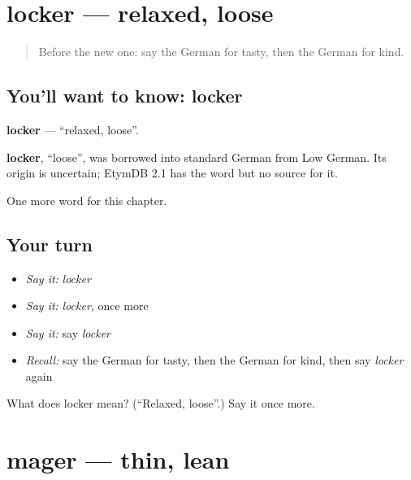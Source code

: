\section[locker]{locker — relaxed, loose}

\label{lesson:GE-C218-locker}



\begin{quote}
Before the new one: say the German for tasty, then the German for kind.
\end{quote}

\subsection*{You'll want to know: locker}
\textbf{locker} — \textquotedblleft{}relaxed, loose\textquotedblright{}.

\begin{cousinweb}
\textbf{locker}, \textquotedblleft{}loose\textquotedblright{}, was borrowed into standard German from Low German. Its origin is uncertain; EtymDB 2.1 has the word but no source for it.
\end{cousinweb}

\begin{grammarlens}[title={What you've built}]
One more word for this chapter.
\end{grammarlens}

\subsection*{Your turn}
\begin{itemize}
\raggedright
  \item \emph{Say it:} \emph{locker}
  \item \emph{Say it:} \emph{locker}, once more
  \item \emph{Say it:} say \emph{locker}
  \item \emph{Recall:} say the German for tasty, then the German for kind, then say \emph{locker} again
\end{itemize}

\begin{tcolorbox}[breakable,colback=teal!4,colframe=teal!35!black,title={Before you move on}]
What does locker mean? (\textquotedblleft{}Relaxed, loose\textquotedblright{}.) Say it once more.
\end{tcolorbox}
\section[mager]{mager — thin, lean}

